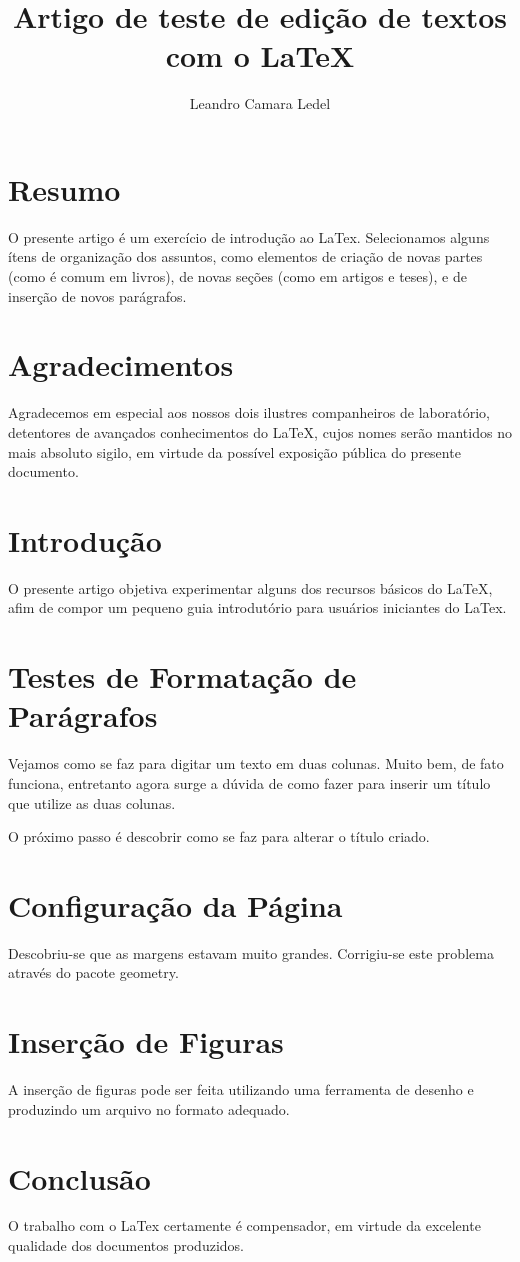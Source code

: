 \documentclass[11pt,a4paper,twocolumn]{article}
\author{Leandro Camara Ledel}
\title{Artigo de teste de edição de textos com o LaTeX}
\begin{document}
\maketitle

\section*{Resumo}
O presente artigo é um exercício de introdução ao LaTex. Selecionamos alguns ítens de organização dos assuntos, como elementos de criação de novas partes (como é comum em livros), de novas seções (como em artigos e teses), e de inserção de novos parágrafos.

\section*{Agradecimentos}
Agradecemos em especial aos nossos dois ilustres companheiros de laboratório, detentores de avançados conhecimentos do LaTeX, cujos nomes serão mantidos no mais absoluto sigilo, em virtude da possível exposição pública do presente documento.

\section{Introdução}
O presente artigo objetiva experimentar alguns dos recursos básicos do LaTeX, afim de compor um pequeno guia introdutório para usuários iniciantes do LaTex.

\section{Testes de Formatação de Parágrafos}
Vejamos como se faz para digitar um texto em duas colunas. Muito bem, de fato funciona, entretanto agora surge a dúvida de como fazer para inserir um título que utilize as duas colunas.

O próximo passo é descobrir como se faz para alterar o título criado.

\section{Configuração da Página}
Descobriu-se que as margens estavam muito grandes. Corrigiu-se este problema através do pacote geometry.
 
\section{Inserção de Figuras}
A inserção de figuras pode ser feita utilizando uma ferramenta de desenho e produzindo um arquivo no formato adequado.

\section{Conclusão}
O trabalho com o LaTex certamente é compensador, em virtude da excelente qualidade dos documentos produzidos.
\end{document}
